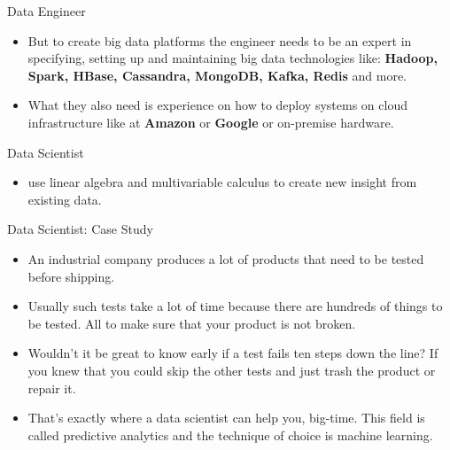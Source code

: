 \documentclass[xcolor=x11names,compress, 24pt]{beamer}
\renewcommand{\(}{\begin{columns}}
\renewcommand{\)}{\end{columns}}
\newcommand{\<}[1]{\begin{column}{#1}}
\renewcommand{\>}{\end{column}}
\begin{document}
\begin{frame}{Data Engineer}
	\begin{itemize}
		\item But to create big data platforms the engineer needs to be an expert in specifying, setting up and maintaining big data technologies like: \textbf{Hadoop, Spark, HBase, Cassandra, MongoDB, Kafka, Redis} and more. \vspace{.25cm}
		
		\item What they also need is experience on how to deploy systems on cloud infrastructure like at \textbf{Amazon} or \textbf{Google} or on-premise hardware. \vspace{.25cm}
	\end{itemize} 
\end{frame}

\begin{frame}{Data Scientist}
	\begin{itemize}
		\item use linear algebra and multivariable calculus to create new insight from existing data.
	\end{itemize}
\end{frame}

\begin{frame}{Data Scientist: Case Study}

\begin{itemize}
\item An industrial company produces a lot of products that need to be tested before shipping. \vspace{.25cm}

\item 	Usually such tests take a lot of time because there are hundreds of things to be tested. All to make sure that your product is not broken. \vspace{.25cm}

\item 	Wouldn't it be great to know early if a test fails ten steps down the line? If you knew that you could skip the other tests and just trash the product or repair it. \vspace{.25cm}

\item 	That's exactly where a data scientist can help you, big-time. This field is called predictive analytics and the technique of choice is machine learning.  \vspace{.25cm}
\end{itemize}

\end{frame}
\end{document}
